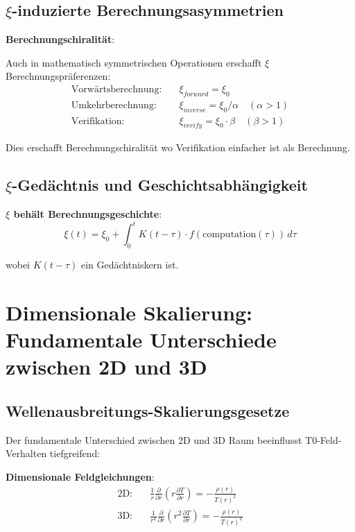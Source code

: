 \documentclass[12pt,a4paper]{article}
\newcommand{\xipar}{\xi}
\begin{document}
	\subsection{$\xipar$-induzierte Berechnungsasymmetrien}
	
	\textbf{Berechnungschiralität}:
	
	Auch in mathematisch symmetrischen Operationen erschafft $\xipar$ Berechnungspräferenzen:
	\begin{align}
		\text{Vorwärtsberechnung}: \quad &\xipar_{forward} = \xipar_0 \\
		\text{Umkehrberechnung}: \quad &\xipar_{inverse} = \xipar_0 / \alpha \quad (\alpha > 1) \\
		\text{Verifikation}: \quad &\xipar_{verify} = \xipar_0 \cdot \beta \quad (\beta > 1)
	\end{align}
	
	Dies erschafft Berechnungschiralität wo Verifikation einfacher ist als Berechnung.
	
	\subsection{$\xipar$-Gedächtnis und Geschichtsabhängigkeit}
	
	\textbf{$\xipar$ behält Berechnungsgeschichte}:
	\begin{equation}
		\xipar(t) = \xipar_0 + \int_0^t K(t-\tau) \cdot f(\text{computation}(\tau)) \, d\tau
	\end{equation}
	
	wobei $K(t-\tau)$ ein Gedächtniskern ist.
	
	\section{Dimensionale Skalierung: Fundamentale Unterschiede zwischen 2D und 3D}
	
	\subsection{Wellenausbreitungs-Skalierungsgesetze}
	
	Der fundamentale Unterschied zwischen 2D und 3D Raum beeinflusst T0-Feld-Verhalten tiefgreifend:
	
	\textbf{Dimensionale Feldgleichungen}:
	\begin{align}
		\text{2D}: \quad &\frac{1}{r} \frac{\partial}{\partial r}\left(r \frac{\partial T}{\partial r}\right) = -\frac{\rho(r)}{T(r)^2} \\
		\text{3D}: \quad &\frac{1}{r^2} \frac{\partial}{\partial r}\left(r^2 \frac{\partial T}{\partial r}\right) = -\frac{\rho(r)}{T(r)^2}
	\end{align}
	
\end{document}
